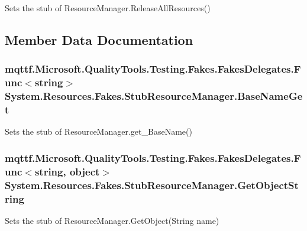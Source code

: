 Sets the stub of Resource\-Manager.\-Release\-All\-Resources()



\subsection{Member Data Documentation}
\hypertarget{class_system_1_1_resources_1_1_fakes_1_1_stub_resource_manager_abcdd8cede7231f75b75cfd00e3b58d69}{
\subsubsection[{Base\-Name\-Get}]{\setlength{\rightskip}{0pt plus 5cm}mqttf.\-Microsoft.\-Quality\-Tools.\-Testing.\-Fakes.\-Fakes\-Delegates.\-Func$<$string$>$ System.\-Resources.\-Fakes.\-Stub\-Resource\-Manager.\-Base\-Name\-Get}}\label{class_system_1_1_resources_1_1_fakes_1_1_stub_resource_manager_abcdd8cede7231f75b75cfd00e3b58d69}


Sets the stub of Resource\-Manager.\-get\-\_\-\-Base\-Name()

\hypertarget{class_system_1_1_resources_1_1_fakes_1_1_stub_resource_manager_ad879a709303a5abe6211347e573f42c9}{
\subsubsection[{Get\-Object\-String}]{\setlength{\rightskip}{0pt plus 5cm}mqttf.\-Microsoft.\-Quality\-Tools.\-Testing.\-Fakes.\-Fakes\-Delegates.\-Func$<$string, object$>$ System.\-Resources.\-Fakes.\-Stub\-Resource\-Manager.\-Get\-Object\-String}}\label{class_system_1_1_resources_1_1_fakes_1_1_stub_resource_manager_ad879a709303a5abe6211347e573f42c9}


Sets the stub of Resource\-Manager.\-Get\-Object(\-String name)

